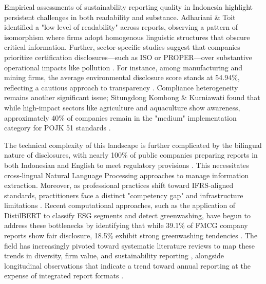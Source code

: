 \documentclass{article}
\begin{document}
Empirical assessments of sustainability reporting quality in Indonesia highlight persistent challenges in both readability and substance. Adhariani \& Toit  \parencite{desi_adhariani_toit_543335d6} identified a "low level of readability" across reports, observing a pattern of isomorphism where firms adopt homogenous linguistic structures that obscure critical information. Further, sector-specific studies suggest that companies prioritize certification disclosures—such as ISO or PROPER—over substantive operational impacts like pollution  \parencite{indah_fajarini_sri_wahyuningrum_1ce983fb}. For instance, among manufacturing and mining firms, the average environmental disclosure score stands at 54.94\%, reflecting a cautious approach to transparency  \parencite{indah_fajarini_sri_wahyuningrum_1ce983fb}. Compliance heterogeneity remains another significant issue; Situngdong Kombong \& Kurniawati  \parencite{christine_bawaeda_sitandung_kombong_d03ec902} found that while high-impact sectors like agriculture and aquaculture show awareness, approximately 40\% of companies remain in the "medium" implementation category for POJK 51 standards  \parencite{christine_bawaeda_sitandung_kombong_d03ec902}.

The technical complexity of this landscape is further complicated by the bilingual nature of disclosures, with nearly 100\% of public companies preparing reports in both Indonesian and English to meet regulatory provisions  \parencite{tri_siwi_nugrahani_056a6914}. This necessitates cross-lingual Natural Language Processing approaches to manage information extraction. Moreover, as professional practices shift toward IFRS-aligned standards, practitioners face a distinct "competency gap" and infrastructure limitations  \parencite{amrie_firmansyah_fd5249a2}. Recent computational approaches, such as the application of DistilBERT to classify ESG segments and detect greenwashing, have begun to address these bottlenecks by identifying that while 39.1\% of FMCG company reports show fair disclosure, 18.5\% exhibit strong greenwashing tendencies  \parencite{anisa_kusuma_putri_4109a23b}. The field has increasingly pivoted toward systematic literature reviews to map these trends in diversity, firm value, and sustainability reporting  \parencite{irma_hidayati_373b816a}, alongside longitudinal observations that indicate a trend toward annual reporting at the expense of integrated report formats  \parencite{kostiantyn_bezverkhyi_e3819b1b}.
\end{document}
